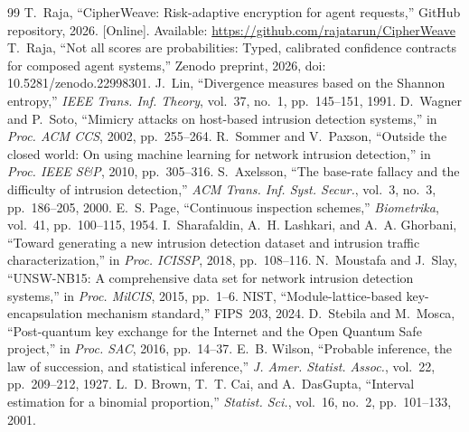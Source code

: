 \documentclass[conference]{IEEEtran}
\theoremstyle{remark}
\begin{document}
\begin{thebibliography}{99}
 T.~Raja, ``CipherWeave: Risk-adaptive encryption for agent requests,'' GitHub repository, 2026. [Online]. Available: \url{https://github.com/rajatarun/CipherWeave}
 T.~Raja, ``Not all scores are probabilities: Typed, calibrated confidence contracts for composed agent systems,'' Zenodo preprint, 2026, doi: 10.5281/zenodo.22998301.
 J.~Lin, ``Divergence measures based on the Shannon entropy,'' \emph{IEEE Trans. Inf. Theory}, vol.~37, no.~1, pp.~145--151, 1991.
 D.~Wagner and P.~Soto, ``Mimicry attacks on host-based intrusion detection systems,'' in \emph{Proc. ACM CCS}, 2002, pp.~255--264.
 R.~Sommer and V.~Paxson, ``Outside the closed world: On using machine learning for network intrusion detection,'' in \emph{Proc. IEEE S\&P}, 2010, pp.~305--316.
 S.~Axelsson, ``The base-rate fallacy and the difficulty of intrusion detection,'' \emph{ACM Trans. Inf. Syst. Secur.}, vol.~3, no.~3, pp.~186--205, 2000.
 E.~S. Page, ``Continuous inspection schemes,'' \emph{Biometrika}, vol.~41, pp.~100--115, 1954.
 I.~Sharafaldin, A.~H. Lashkari, and A.~A. Ghorbani, ``Toward generating a new intrusion detection dataset and intrusion traffic characterization,'' in \emph{Proc. ICISSP}, 2018, pp.~108--116.
 N.~Moustafa and J.~Slay, ``UNSW-NB15: A comprehensive data set for network intrusion detection systems,'' in \emph{Proc. MilCIS}, 2015, pp.~1--6.
 NIST, ``Module-lattice-based key-encapsulation mechanism standard,'' FIPS~203, 2024.
 D.~Stebila and M.~Mosca, ``Post-quantum key exchange for the Internet and the Open Quantum Safe project,'' in \emph{Proc. SAC}, 2016, pp.~14--37.
 E.~B. Wilson, ``Probable inference, the law of succession, and statistical inference,'' \emph{J. Amer. Statist. Assoc.}, vol.~22, pp.~209--212, 1927.
 L.~D. Brown, T.~T. Cai, and A.~DasGupta, ``Interval estimation for a binomial proportion,'' \emph{Statist. Sci.}, vol.~16, no.~2, pp.~101--133, 2001.
\end{thebibliography}
\end{document}
